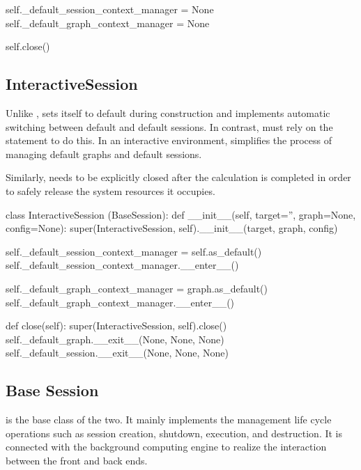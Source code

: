 \begin{content}
\begin{leftbar}
\begin{python}
    self._default_session_context_manager = None
    self._default_graph_context_manager = None

    self.close()
\end{python}
\end{leftbar}


\subsection{InteractiveSession}

Unlike ,  sets itself to default during construction and implements automatic switching between default and default sessions. In contrast,  must rely on the  statement to do this. In an interactive environment,  simplifies the process of managing default graphs and default sessions.

Similarly,  needs to be explicitly closed after the calculation is completed in order to safely release the system resources it occupies.

\begin{leftbar}
\begin{python}
class InteractiveSession (BaseSession):
  def __init__(self, target='', graph=None, config=None):
    super(InteractiveSession, self).__init__(target, graph, config)

    self._default_session_context_manager = self.as_default()
    self._default_session_context_manager.__enter__()

    self._default_graph_context_manager = graph.as_default()
    self._default_graph_context_manager.__enter__()

  def close(self):
    super(InteractiveSession, self).close()
    self._default_graph.__exit__(None, None, None)
    self._default_session.__exit__(None, None, None)
\end{python}
\end{leftbar}


\subsection{Base Session}
 is the base class of the two. It mainly implements the management life cycle operations such as session creation, shutdown, execution, and destruction. It is connected with the background computing engine to realize the interaction between the front and back ends.



\end{content}
